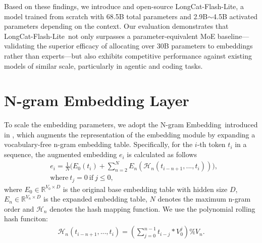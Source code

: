 \documentclass{article}
\newcommand{\longcat}{LongCat-Flash-Lite\xspace}
\newcommand{\method}{N-gram Embedding}
\begin{document}
Based on these findings, we introduce and open-source \longcat, a model trained from scratch with 68.5B total parameters and 2.9B$\sim$4.5B activated parameters depending on the context. Our evaluation demonstrates that \longcat\ not only surpasses a parameter-equivalent MoE baseline—validating the superior efficacy of allocating over 30B parameters to embeddings rather than experts—but also exhibits competitive performance against existing models of similar scale, particularly in agentic and coding tasks.


\section{N-gram Embedding Layer}
\label{sec:ngram-embedding}
To scale the embedding parameters, we adopt the \method\ introduced in \cite{clark-etal-2022-canine, huang2025overtokenizedtransformervocabularygenerally, pagnoni-etal-2025-byte}, which augments the representation of the embedding module by expanding a vocabulary-free n-gram embedding table.
Specifically, for the $i$-th token $t_i$ in a sequence, the augmented embedding $e_i$ is calculated as follows
\begin{equation}
\label{eq:ne-v1}
\begin{aligned}
    &e_i = \frac{1}{N}\big(E_0(t_i) + \sum_{n=2}^N E_n(\mathcal{H}_n({t_{i-n+1}, ..., t_i}))\big), \\
    &\text{where}~ t_{j} = 0 ~\text{if}~ j \leq 0,
\end{aligned}
\end{equation}
where $E_0 \in \mathbb{R}^{V_0 \times D}$ is the original base embedding table with hidden size $D$, $E_n \in \mathbb{R}^{V_n \times D}$ is the expanded embedding table, $N$ denotes the maximum n-gram order and $\mathcal{H}_n$ denotes the hash mapping function.
We use the polynomial rolling hash funciton:
\begin{equation}
\label{eq:hash}
    \begin{aligned}
        \mathcal{H}_n({t_{i-n+1}, ..., t_i}) = (\sum_{j=0}^{n-1} t_{i-j} * V_0^j) \% V_n.
    \end{aligned}
\end{equation}
\end{document}
